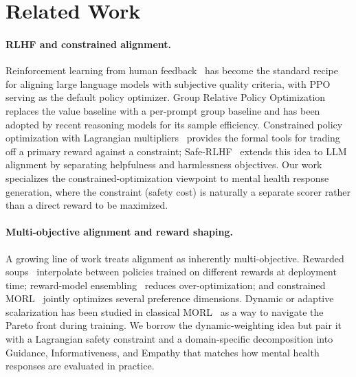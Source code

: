 \documentclass[10pt,twocolumn]{article}
\begin{document}
\section{Related Work}
\label{sec:related-work}

\paragraph{RLHF and constrained alignment.}
Reinforcement learning from human feedback~\citep{christiano2017rlhf, ouyang2022rlhf, bai2022hh} has become the standard recipe for aligning large language models with subjective quality criteria, with PPO~\citep{schulman2017ppo} serving as the default policy optimizer. Group Relative Policy Optimization~\citep{shao2024grpo} replaces the value baseline with a per-prompt group baseline and has been adopted by recent reasoning models for its sample efficiency. Constrained policy optimization with Lagrangian multipliers~\citep{achiam2017cpo, ray2019safetygym} provides the formal tools for trading off a primary reward against a constraint; Safe-RLHF~\citep{dai2024saferlhf} extends this idea to LLM alignment by separating helpfulness and harmlessness objectives. Our work specializes the constrained-optimization viewpoint to mental health response generation, where the constraint (safety cost) is naturally a separate scorer rather than a direct reward to be maximized.

\paragraph{Multi-objective alignment and reward shaping.}
A growing line of work treats alignment as inherently multi-objective. Rewarded soups~\citep{rame2023rewardedsoups} interpolate between policies trained on different rewards at deployment time; reward-model ensembling~\citep{coste2024rewardensemble} reduces over-optimization; and constrained MORL~\citep{wu2024morlhf} jointly optimizes several preference dimensions. Dynamic or adaptive scalarization has been studied in classical MORL~\citep{xu2020prediction, hayes2022survey} as a way to navigate the Pareto front during training. We borrow the dynamic-weighting idea but pair it with a Lagrangian safety constraint and a domain-specific decomposition into Guidance, Informativeness, and Empathy that matches how mental health responses are evaluated in practice.
\end{document}

